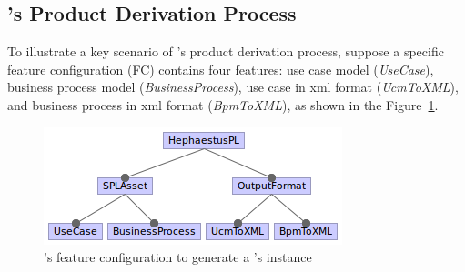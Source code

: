 


\subsection{\hpl's Product Derivation Process} \label{product-derivation-hpl}

To illustrate a key scenario of \hpl's product derivation process, suppose a specific feature configuration (FC) contains four features: use case model (\emph{UseCase}), business process model (\emph{BusinessProcess}), use case in xml format (\emph{UcmToXML}), and business process in xml format (\emph{BpmToXML}), as shown in the Figure~\ref{fig:fc-ucm-bpm}.


\begin{figure}[bth]
\begin{center}
\includegraphics[scale=0.8]{imagens/fc-ucm-bpm.png}
\end{center}
\caption{\hpl's feature configuration to generate a \hpl's instance}
\label{fig:fc-ucm-bpm}
\end{figure}

